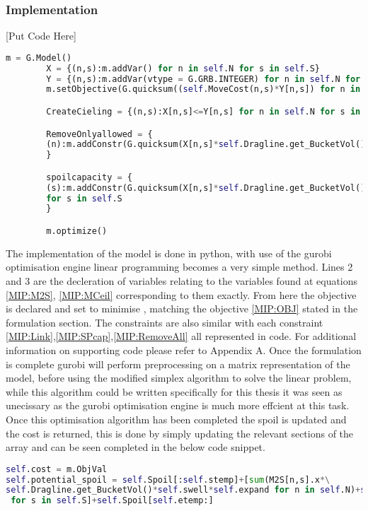 \subsubsection{Implementation}
[Put Code Here]
\begin{lstlisting}[language=Python]
		m = G.Model()
		X = {(n,s):m.addVar() for n in self.N for s in self.S}
		Y = {(n,s):m.addVar(vtype = G.GRB.INTEGER) for n in self.N for s in self.S}
		m.setObjective(G.quicksum((self.MoveCost(n,s)*Y[n,s]) for n in self.N for s in self.S),G.GRB.MINIMIZE)

		CreateCieling = {(n,s):X[n,s]<=Y[n,s] for n in self.N for s in self.S}

		RemoveOnlyallowed = {
		(n):m.addConstr(G.quicksum(X[n,s]*self.Dragline.get_BucketVol() for s in self.S)==self.Mine[n]) for n in self.N
		}

		spoilcapacity = {
		(s):m.addConstr(G.quicksum(X[n,s]*self.Dragline.get_BucketVol()*self.swell*self.expand for n in self.N)+self.Spoil[s]<=self.spoilcap)
		for s in self.S
		}

		m.optimize()
\end{lstlisting}
The implementation of the model is done in python, with use of the gurobi optimisation engine linear programming becomes a very simple method. Lines 2 and 3 are the decleration of variables relating to the variables found at equations \ref{MIP:M2S}, \ref{MIP:MCeil} corresponding to them exactly. From here the objective is declared and set to minimise , matching the objective \ref{MIP:OBJ} stated in the formulation section. The constraints are also similar with each constraint \ref{MIP:Link},\ref{MIP:SPcap},\ref{MIP:RemoveAll} all represented in code. For additional information on supporting code please refer to Appendix A. Once the formulation is complete gurobi will perform preprocessing on a matrix representation of the model, before using the modified simplex algorithm to solve the linear problem, while this algorithm could be written specifically for this thesis it was seen as unecissary as the gurobi optimisation engine is much more effcient at this task. 
\\
Once this optimisation algorithm has been completed the spoil is updated and the cost is returned, this is done by simply updating the relevant sections of the array and can be seen completed in the below code snippet.
\begin{lstlisting}[language=python]
self.cost = m.ObjVal
self.potential_spoil = self.Spoil[:self.stemp]+[sum(M2S[n,s].x*\
self.Dragline.get_BucketVol()*self.swell*self.expand for n in self.N)+self.Spoil[s]\
 for s in self.S]+self.Spoil[self.etemp:]

\end{lstlisting}
